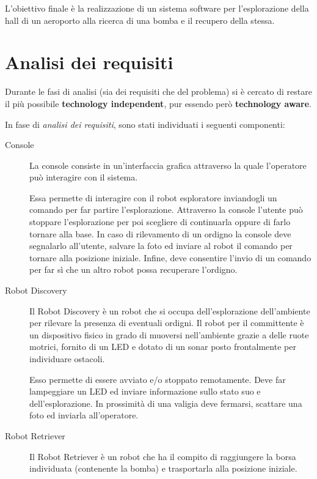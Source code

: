 \documentclass{llncs}
\newcommand{\labelsec}[1]{\label{sec:#1}}
\begin{document}
L'obiettivo finale è la realizzazione di un sistema software per l'esplorazione della hall di un aeroporto alla ricerca di una bomba e il recupero della stessa.

\section{Analisi dei requisiti}\labelsec{req_analysis}

Durante le fasi di analisi (sia dei requisiti che del problema) si è cercato di restare il più possibile \textbf{technology independent}, pur essendo però \textbf{technology aware}.

In fase di \textit{analisi dei requisiti}, sono stati individuati i seguenti componenti:

\begin{description}
  \item[Console]
    La console consiste in un'interfaccia grafica attraverso la quale l'operatore può interagire con il sistema.

    Essa permette di interagire con il robot esploratore inviandogli un comando per far partire l'esplorazione.
    Attraverso la console l'utente può stoppare l'esplorazione per poi scegliere di continuarla oppure di farlo tornare alla base.
    In caso di rilevamento di un ordigno la console deve segnalarlo all'utente, salvare la foto ed inviare al robot il comando per tornare alla posizione iniziale.
    Infine, deve consentire l'invio di un comando per far sì che un altro robot possa recuperare l'ordigno.

  \item[Robot Discovery]
    Il Robot Discovery è un robot che si occupa dell'esplorazione dell'ambiente per rilevare la presenza di eventuali ordigni.
    Il robot per il committente è un dispositivo fisico in grado di muoversi nell'ambiente grazie a delle ruote motrici, fornito di un LED
    e dotato di un sonar posto frontalmente per individuare ostacoli.

    Esso permette di essere avviato e/o stoppato remotamente.
    Deve far lampeggiare un LED ed inviare informazione sullo stato suo e dell'esplorazione.
    In prossimità di una valigia deve fermarsi, scattare una foto ed inviarla all'operatore.

  \item[Robot Retriever]
    Il Robot Retriever è un robot che ha il compito di raggiungere la borsa individuata (contenente la bomba) e trasportarla alla posizione iniziale.
\end{description}
\end{document}
